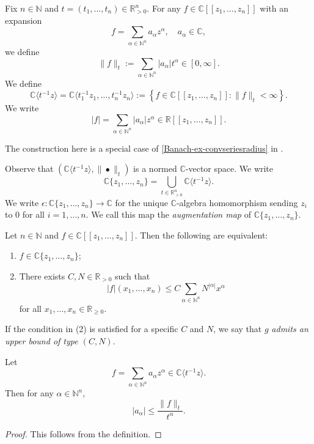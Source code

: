 \begin{definition}
    Fix $n\in \mathbb{N}$ and $t=(t_1,\ldots,t_n)\in \mathbb{R}_{> 0}^n$. For any $f\in \mathbb{C}[[z_1,\ldots,z_n]]$ with an expansion
    \[
        f=\sum_{\alpha\in \mathbb{N}^n} a_{\alpha}z^{\alpha},\quad a_{\alpha}\in \mathbb{C},  
    \]
    we define
    \[
        \|f\|_t:=\sum_{\alpha\in \mathbb{N}^n} |a_{\alpha}| t^{\alpha}\in [0,\infty].
    \]
    We define
    \[
        \mathbb{C}\langle t^{-1}z\rangle =\mathbb{C}\langle t_1^{-1}z_1,\ldots,t_n^{-1}z_n \rangle:=\left\{f\in \mathbb{C}[[z_1,\ldots,z_n]]: \|f\|_t<\infty \right\}.
    \]
    We write
    \[
        |f|=\sum_{\alpha \in \mathbb{N}^n}|a_{\alpha}|z^{\alpha}\in \mathbb{R}[[z_1,\dots,z_n]].
    \]
\end{definition}
The construction here is a special case of \cref{Banach-ex-convseriesradius} in .

Observe that $(\mathbb{C}\langle t^{-1}z\rangle ,\|\bullet\|_t)$ is a normed $\mathbb{C}$-vector space. We write
\begin{equation}\label{eq-convpowerseriesasunion}
    \mathbb{C}\{ z_1,\ldots,z_n\}=\bigcup_{t\in \mathbb{R}_{>0}^n}\mathbb{C}\langle t^{-1}z\rangle .
\end{equation}
We write $\epsilon:\mathbb{C}\{ z_1,\ldots,z_n\}\rightarrow \mathbb{C}$ for the unique $\mathbb{C}$-algebra homomorphism sending $z_i$ to $0$ for all $i=1,\ldots,n$. We call this map the \emph{augmentation map} of $\mathbb{C}\{ z_1,\ldots,z_n\}$.

\begin{proposition}\label{prop-majCN}
    Let  $n\in \mathbb{N}$ and $f\in \mathbb{C}[[z_1,\ldots,z_n]]$. Then the following are equivalent:
    \begin{enumerate}
        \item $f\in \mathbb{C}\{ z_1,\ldots,z_n\}$;
        \item There exists $C,N\in \mathbb{R}_{>0}$ such that
            \[
                |f|(x_1,\ldots,x_n)\leq C\sum_{\alpha\in \mathbb{N}^n} N^{|\alpha|}x^{\alpha}  
            \]
            for all $x_1,\ldots,x_n \in \mathbb{R}_{\geq 0}$.
    \end{enumerate}
\end{proposition}
If the condition in (2) is satisfied for a specific $C$ and $N$, we say that $g$ \emph{admits an upper bound of type $(C,N)$}.

\begin{proposition}
    Let 
    \[
        f=\sum_{\alpha\in \mathbb{N}^n} a_{\alpha}z^{\alpha}\in  \mathbb{C}\langle t^{-1}z\rangle. 
    \]
    Then for any $\alpha \in \mathbb{N}^n$,
    \[
      |a_{\alpha}|\leq  \frac{\|f\|_t}{t^{\alpha}}.
    \]
\end{proposition}
\begin{proof}
    This follows from the definition.
\end{proof}

